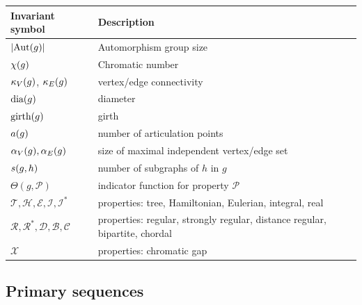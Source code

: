\documentclass[12pt]{article}
\begin{document}
\begin{appendices}
\begin{longtable}{ l l}
\toprule
Invariant symbol & Description \\
\midrule
$| \text{Aut}(g) |$ & Automorphism group size \\
$\chi(g)$ & Chromatic number \\
$\kappa_{V}(g)$, $\kappa_{E}(g)$ & vertex/edge connectivity \\
$\text{dia}(g)$ & diameter \\
$\text{girth}(g)$ & girth \\
$a(g)$ & number of articulation points \\
$\alpha_V(g), \alpha_E(g)$ & size of maximal independent vertex/edge set \\
$s{}(g,h)$ & number of subgraphs of $h$ in $g$ \\
$\Theta(g,\mathcal{P})$ & indicator function for property $\mathcal{P}$ \\
$\mathcal{T},\mathcal{H},\mathcal{E}, \mathcal{I}, \mathcal{I}^*$ & properties: tree, Hamiltonian, Eulerian, integral, real \\
$\mathcal{R},\mathcal{R}^*,\mathcal{D}, \mathcal{B}, \mathcal{C}$ & properties: regular, strongly regular, distance regular, bipartite, chordal \\
$\mathcal{X}$ & properties: chromatic gap
\end{longtable}

\subsection{Primary sequences}


\end{appendices}
\end{document}
